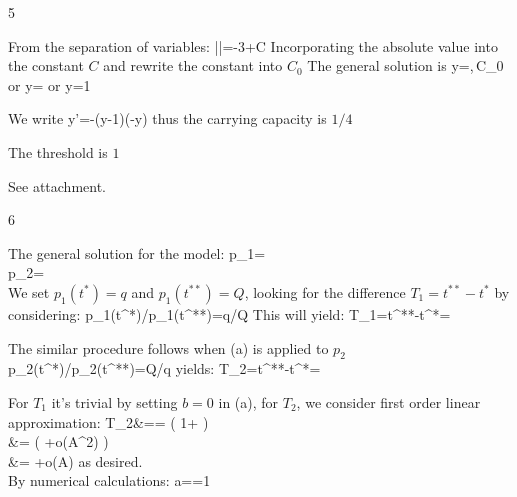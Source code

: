 \begin{vv286_ms}{5}
\item[(i)]
From the separation of variables:
\eq
{
\ln\left|\right|=-3+C
}
Incorporating the absolute value into the constant $C$ and rewrite the constant into $C_0$
	The general solution is
	\eq
	{
	y=,\,C_0\in\R
	\quad
	\hbox{or}
	\quad
	y=
	\quad
	\hbox{or}
	\quad
	y=1
	}
\item[(ii)]
	We write
	\eq
	{
	y'=-(y-1)(-y)
	}
	thus the carrying capacity is $1/4$
\item[(iii)]
	The threshold is 
	$1$
\item[(iv)]
	See attachment.
\end{vv286_ms}


\begin{vv286_ms}{6}
\item[(a)]
	The general solution for the model:
	\eq
	{
	p_1=\\
	p_2=\\
	}
	We set $p_1(t^*)=q$ and $p_1(t^{**})=Q$, looking
	for the difference $T_1=t^{**}-t^*$ by considering:
	\eq
	{
	p_1(t^*)/p_1(t^{**})=q/Q
	}
	This will yield:
	\eq
	{
	T_1=t^{**}-t^*=\ln{}
	}
\item[(b)]
	The similar procedure follows when (a) is applied
	to $p_2$
	\eq
	{
	p_2(t^*)/p_2(t^{**})=Q/q
	}
	yields:
	\eq
	{
	T_2=t^{**}-t^*=\ln{}
	}
\item[(c)]
	For $T_1$ it's trivial by setting $b=0$ in (a),
	for $T_2$, we consider first order linear
	approximation:
	\eq
	{
	T_2&=\ln{}=
	\ln\left( 1+ \right)\\
	&\quad=
	\left( +o(A^2) \right)\\
	&\quad=
	+o(A)
	}
	as desired. \\
	By numerical calculations:
	\eq
	{
	a==1
	}
\end{vv286_ms}



